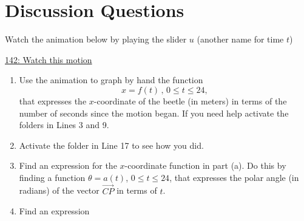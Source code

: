 \documentclass{ximera}
\begin{document}
\section{Discussion Questions}
\begin{question} \label{QLDkfdRE}
Watch the animation below by playing the slider $u$ (another name for time $t$)

\begin{onlineOnly}
    \begin{center}
\end{center}
\end{onlineOnly}

\href{https://www.desmos.com/calculator/eav4z1v9ov}{142: Watch this motion}

\begin{enumerate}
\item Use the animation to graph by hand the function
\[
  x = f(t) \, , \, 0\leq t \leq 24,
\]
that expresses the $x$-coordinate of the beetle (in meters) in terms of the number of seconds since the motion began. If you need help activate the folders in Lines 3 and 9.

\item Activate the folder in Line 17 to see how you did.

\item Find an expression for the $x$-coordinate function in part (a). Do this by finding a function $\theta = a(t)$, $0\leq t \leq 24$, that expresses the polar angle (in radians) of the vector $\overrightarrow{CP}$ in terms of $t$.

\item Find an expression 

\end{enumerate}


\end{question} 
\end{document}
